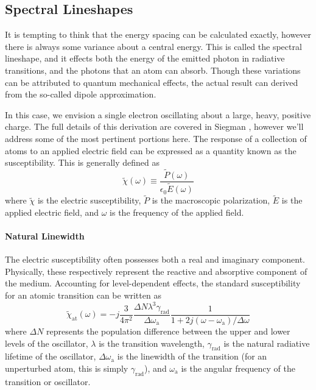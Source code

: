 \subsection{Spectral Lineshapes}
It is tempting to think that the energy spacing can be calculated exactly,
however there is always some variance about a central energy. This is called the
spectral lineshape, and it effects both the energy of the emitted photon in
radiative transitions, and the photons that an atom can absorb. Though these
variations can be attributed to quantum mechanical effects, the actual result
can derived from the so-called dipole approximation.

In this case, we envision a single electron oscillating about a large, heavy,
positive charge. The full details of this derivation are covered in Siegman
\cite{Siegman1986}, however we'll address some of the most pertinent portions
here. The response of a collection of atoms to an applied electric field can be
expressed as a quantity known as the susceptibility. This is generally defined
as
\begin{equation}
    \tilde{\chi}(\omega) \equiv
    \frac{\tilde{P}(\omega)}{\epsilon_0\tilde{E}(\omega)}
\end{equation}
where $\tilde{\chi}$ is the electric susceptibility, $\tilde{P}$ is the
macroscopic polarization, $\tilde{E}$ is the applied electric field, and
$\omega$ is the frequency of the applied field.

\paragraph{Natural Linewidth}
The electric susceptibility often possesses both a real and imaginary component.
Physically, these respectively represent the reactive and absorptive component
of the medium. Accounting for level-dependent effects, the standard
susceptibility for an atomic transition can be written as
\begin{equation}
    \tilde{\chi}_\mathrm{at}(\omega) = -j\frac{3}{4\pi^2}\frac{\Delta
    N\lambda^3\gamma_\mathrm{rad}}{\Delta\omega_\mathrm{a}}\frac{1}{1
    + 2j(\omega - \omega_\mathrm{a})/\Delta\omega}
\end{equation}
where $\Delta N$ represents the population difference between the upper and
lower levels of the oscillator, $\lambda$ is the transition wavelength,
$\gamma_\mathrm{rad}$ is the natural radiative lifetime of the oscillator,
$\Delta\omega_\mathrm{a}$ is the linewidth of the transition (for an unperturbed
atom, this is simply $\gamma_\mathrm{rad}$), and $\omega_\mathrm{a}$ is the
angular frequency of the transition or oscillator.

